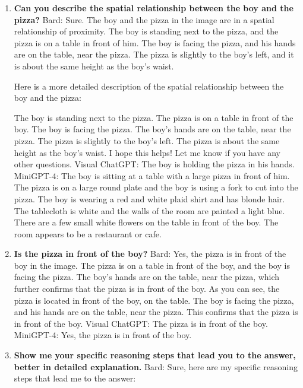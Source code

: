     \begin{enumerate}
        \item \textbf{Can you describe the spatial relationship between the boy and the pizza?}
        \subitem 
        Bard:
        Sure. The boy and the pizza in the image are in a spatial relationship of proximity. The boy is standing next to the pizza, and the pizza is on a table in front of him. The boy is facing the pizza, and his hands are on the table, near the pizza. The pizza is slightly to the boy's left, and it is about the same height as the boy's waist.

        Here is a more detailed description of the spatial relationship between the boy and the pizza:

        The boy is standing next to the pizza.
        The pizza is on a table in front of the boy.
        The boy is facing the pizza.
        The boy's hands are on the table, near the pizza.
        The pizza is slightly to the boy's left.
        The pizza is about the same height as the boy's waist.
        I hope this helps! Let me know if you have any other questions.
        \subitem Visual ChatGPT: The boy is holding the pizza in his hands.
        \subitem MiniGPT-4: The boy is sitting at a table with a large pizza in front of him. The pizza is on a large round plate and the boy is using a fork to cut into the pizza. The boy is wearing a red and white plaid shirt and has blonde hair. The tablecloth is white and the walls of the room are painted a light blue. There are a few small white flowers on the table in front of the boy. The room appears to be a restaurant or cafe.
        \item \textbf{Is the pizza in front of the boy?}
        \subitem Bard: Yes, the pizza is in front of the boy in the image. The pizza is on a table in front of the boy, and the boy is facing the pizza. The boy's hands are on the table, near the pizza, which further confirms that the pizza is in front of the boy.
        As you can see, the pizza is located in front of the boy, on the table. The boy is facing the pizza, and his hands are on the table, near the pizza. This confirms that the pizza is in front of the boy.
        \subitem Visual ChatGPT: The pizza is in front of the boy.
        \subitem MiniGPT-4: Yes, the pizza is in front of the boy.
        \item \textbf{Show me your specific reasoning steps that lead you to the answer, better in detailed explanation.}
        \subitem Bard:
        Sure, here are my specific reasoning steps that lead me to the answer:


\end{enumerate}
